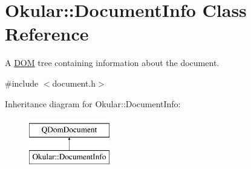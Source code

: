 \hypertarget{classOkular_1_1DocumentInfo}{\section{Okular\+:\+:Document\+Info Class Reference}
\label{classOkular_1_1DocumentInfo}
}


A \hyperlink{namespaceDOM}{D\+O\+M} tree containing information about the document.  




{\ttfamily \#include $<$document.\+h$>$}

Inheritance diagram for Okular\+:\+:Document\+Info\+:\begin{figure}[H]
\begin{center}
\leavevmode
\includegraphics[height=2.000000cm]{classOkular_1_1DocumentInfo}
\end{center}
\end{figure}
